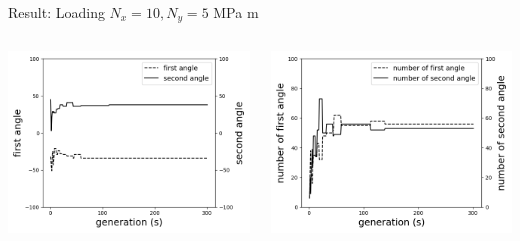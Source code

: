 \documentclass{beamer}
\begin{document}
\begin{frame}{Result: Loading $N_x = 10, N_y=5 $ MPa m}
\begin{columns}
\begin{column}{0.5\textwidth}
        \begin{center}
              \includegraphics[width=1.0\linewidth]{2020-11-10-pre-image/two_distinct_angle_angle_change.png}
        \end{center}
    \end{column}
    \begin{column}{0.5\textwidth}
        \begin{center}
              \includegraphics[width=1.0\linewidth]{2020-11-10-pre-image/two_distinct_angler_number_change.png}
        \end{center}
    \end{column}
\end{columns}
\end{frame}
\end{document}
